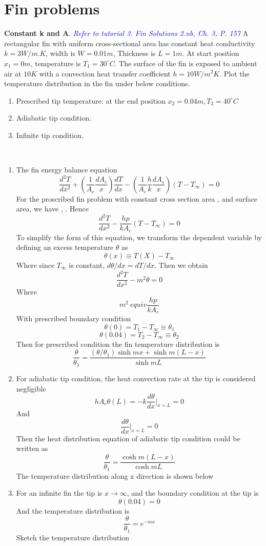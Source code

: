 \section{Fin problems}
\begin{example}
\textbf{Constant k and A}. 
\textcolor{blue} {\emph{Refer to tutorial 3.  Fin Solutions 2.nb, Ch. 3, P. 157}}
A rectangular fin with uniform cross-sectional area has constant heat conductivity
$k=3W/m.K$, width is $W=0.01m$, Thickness is $L=1m$. At start position $x_1=0m$, temperature is $T_1=30^\circ C$. The surface of the fin is exposed to ambient air at
$10K$ with a convection heat transfer coefficient $h=10W/m^2K$. Plot the temperature distribution in the fin under below conditions.
\begin{enumerate}
\item Prescribed tip temperature: at the end position $x_2=0.04m, T_2=40^\circ C$
\item Adiabatic tip condition.
\item Infinite tip condition.
\end{enumerate}
\end{example}

\begin{solution}
~
\begin{enumerate}
\item
The fin energy balance equation
$$
\frac{d^2 T}{dx^2} + 
\left(\frac{1}{A_c}\frac{dA_c}{x}\right)\frac{dT}{dx}-
\left(\frac{1}{A_c}\frac{h}{k}\frac{dA_s}{x}\right)(T-T_\infty)=0
$$
For the proscribed fin problem with constant cross section area  , 
and surface area, we have   ,   . Hence 
$$
\frac{d^2 T}{dx^2}-
\frac{hp}{kA_c}(T-T_\infty)=0
$$
To simplify the form of this equation, we transform the dependent variable by 
defining an excess temperature $\theta$ as
$$\theta(x) \equiv T(X)-T_\infty$$
Where since $T_\infty$ is constant, $d\theta/dx=dT/dx$. Then we obtain
$$\frac{d^2 T}{dx^2}-m^2\theta=0$$
Where
$$m^2 \ equiv \frac{hp}{kA_c}$$
With prescribed boundary condition
$$\theta(0)=T_1-T_\infty \equiv \theta_1$$
$$\theta(0.04)=T_2-T_\infty \equiv \theta_2$$
Then for prescribed condition the fin temperature distribution is
$$
\frac{\theta}{\theta_1}=
\frac{(\theta/\theta_1)\sinh mx+\sinh m(L-x)}{\sinh mL}
$$
\item
For adiabatic tip condition, the heat convection rate at the tip is considered negligible
$$hA_c\theta(L)=-k\frac{d\theta}{dx}|_{x=L}=0$$
And
$$\frac{d\theta}{dx}|_{x=L}=0$$
Then the heat distribution equation of adiabatic tip condition could be written as
$$\frac{\theta}{\theta_1}=
\frac{\cosh m(L-x)}{\cosh mL}
$$
The temperature distribution along x direction is shown below
\item
For an infinite fin the tip is  $x\to\infty$, and the boundary condition at the tip is 
$$\theta(0.04)=0$$
And the temperature distribution is 
$$\frac{\theta}{\theta_1}=e^{-mx}$$
Sketch the temperature distribution


\end{enumerate}
\end{solution}


